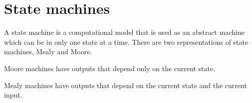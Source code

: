 \section{State machines}

A state machine is a computational model that is used as an
abstract machine which can be in only one state at a time.
There are two representations of state machines, Mealy and Moore.

Moore machines have outputs that depend only on the current state.

Mealy machines have outputs that depend on the current state and the current input.

